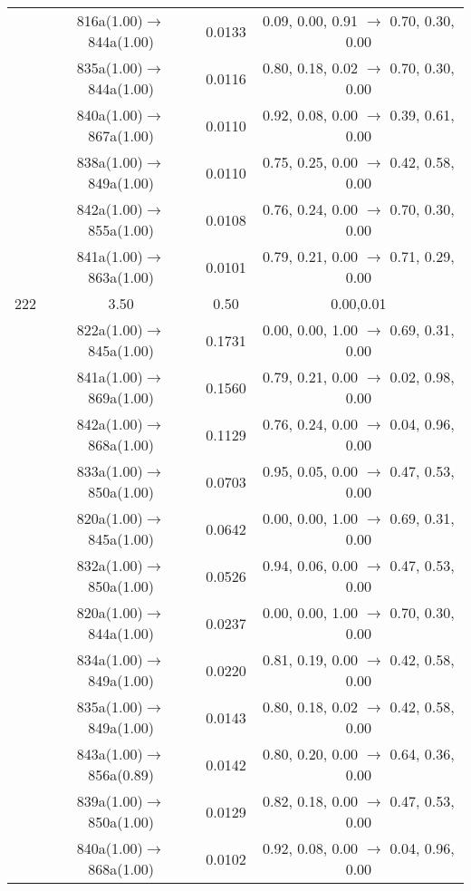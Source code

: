 \documentclass[10pt,a4paper]{article}
\begin{document}
\begin{longtable}{c|c|c|c}
 	& 816a(1.00)$\rightarrow$844a(1.00) &	 0.0133 &	 0.09, 0.00, 0.91 $\rightarrow$ 0.70, 0.30, 0.00 \\ 
 	& 835a(1.00)$\rightarrow$844a(1.00) &	 0.0116 &	 0.80, 0.18, 0.02 $\rightarrow$ 0.70, 0.30, 0.00 \\ 
 	& 840a(1.00)$\rightarrow$867a(1.00) &	 0.0110 &	 0.92, 0.08, 0.00 $\rightarrow$ 0.39, 0.61, 0.00 \\ 
 	& 838a(1.00)$\rightarrow$849a(1.00) &	 0.0110 &	 0.75, 0.25, 0.00 $\rightarrow$ 0.42, 0.58, 0.00 \\ 
 	& 842a(1.00)$\rightarrow$855a(1.00) &	 0.0108 &	 0.76, 0.24, 0.00 $\rightarrow$ 0.70, 0.30, 0.00 \\ 
 	& 841a(1.00)$\rightarrow$863a(1.00) &	 0.0101 &	 0.79, 0.21, 0.00 $\rightarrow$ 0.71, 0.29, 0.00 \\ 
 \hline222 &	 3.50 &	 0.50 &	 0.00,0.01 \\ 
  	& 822a(1.00)$\rightarrow$845a(1.00) &	 0.1731 &	 0.00, 0.00, 1.00 $\rightarrow$ 0.69, 0.31, 0.00 \\ 
 	& 841a(1.00)$\rightarrow$869a(1.00) &	 0.1560 &	 0.79, 0.21, 0.00 $\rightarrow$ 0.02, 0.98, 0.00 \\ 
 	& 842a(1.00)$\rightarrow$868a(1.00) &	 0.1129 &	 0.76, 0.24, 0.00 $\rightarrow$ 0.04, 0.96, 0.00 \\ 
 	& 833a(1.00)$\rightarrow$850a(1.00) &	 0.0703 &	 0.95, 0.05, 0.00 $\rightarrow$ 0.47, 0.53, 0.00 \\ 
 	& 820a(1.00)$\rightarrow$845a(1.00) &	 0.0642 &	 0.00, 0.00, 1.00 $\rightarrow$ 0.69, 0.31, 0.00 \\ 
 	& 832a(1.00)$\rightarrow$850a(1.00) &	 0.0526 &	 0.94, 0.06, 0.00 $\rightarrow$ 0.47, 0.53, 0.00 \\ 
 	& 820a(1.00)$\rightarrow$844a(1.00) &	 0.0237 &	 0.00, 0.00, 1.00 $\rightarrow$ 0.70, 0.30, 0.00 \\ 
 	& 834a(1.00)$\rightarrow$849a(1.00) &	 0.0220 &	 0.81, 0.19, 0.00 $\rightarrow$ 0.42, 0.58, 0.00 \\ 
 	& 835a(1.00)$\rightarrow$849a(1.00) &	 0.0143 &	 0.80, 0.18, 0.02 $\rightarrow$ 0.42, 0.58, 0.00 \\ 
 	& 843a(1.00)$\rightarrow$856a(0.89) &	 0.0142 &	 0.80, 0.20, 0.00 $\rightarrow$ 0.64, 0.36, 0.00 \\ 
 	& 839a(1.00)$\rightarrow$850a(1.00) &	 0.0129 &	 0.82, 0.18, 0.00 $\rightarrow$ 0.47, 0.53, 0.00 \\ 
 	& 840a(1.00)$\rightarrow$868a(1.00) &	 0.0102 &	 0.92, 0.08, 0.00 $\rightarrow$ 0.04, 0.96, 0.00 \\ 

\end{longtable}
\end{document}
